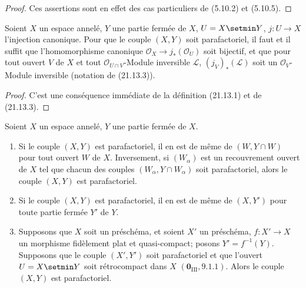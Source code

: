 \begin{proof}
Ces assertions sont en effet des cas particuliers de (5.10.2) et (5.10.5).
\end{proof}

\begin{proposition}[21.13.5]
\label{IV.21.13.5}
Soient $X$ un espace annelé, $Y$ une partie fermée de $X$, $U=X\setmin Y$,
$j:U\to X$ l'injection canonique. Pour que le couple $(X,Y)$ soit parafactoriel, il
faut et il suffit que l'homomorphisme canonique $\mathcal O_X\to j_*(\mathcal O_U)$
soit bijectif, et que pour tout ouvert $V$ de $X$ et tout
$\mathcal O_{U\cap V}$-Module inversible $\mathscr L$, $(j_V)_*(\mathscr L)$ soit un
$\mathcal O_V$-Module inversible (notation de \textup{(21.13.3))}.
\end{proposition}

\begin{proof}
C'est une conséquence immédiate de la définition (21.13.1) et de (21.13.3).
\end{proof}

\begin{corollary}[21.13.6]
\label{IV.21.13.6}
Soient $X$ un espace annelé, $Y$ une partie fermée de $X$.
\begin{enumerate}[label=\textup{(\roman*)}]
  \item Si le couple $(X,Y)$ est parafactoriel, il en est de même de
  $(W,Y\cap W)$ pour tout ouvert $W$ de $X$. Inversement, si $(W_\alpha)$ est un
  recouvrement ouvert de $X$ tel que chacun des couples
  $(W_\alpha,Y\cap W_\alpha)$ soit parafactoriel, alors le couple $(X,Y)$ est
  parafactoriel.
  \item Si le couple $(X,Y)$ est parafactoriel, il en est de même de $(X,Y')$ pour
  toute partie fermée $Y'$ de $Y$.
  \item Supposons que $X$ soit un préschéma, et soient $X'$ un préschéma,
  $f:X'\to X$ un morphisme fidèlement plat et quasi-compact; posons
  $Y'=f^{-1}(Y)$. Supposons que le couple $(X',Y')$ soit parafactoriel et que
  l'ouvert $U=X\setmin Y$ soit rétrocompact dans $X$ $(\mathbf 0_{\mathrm{III}}, 9.1.1)$.
  Alors le couple $(X,Y)$ est parafactoriel.
\end{enumerate}
\end{corollary}

